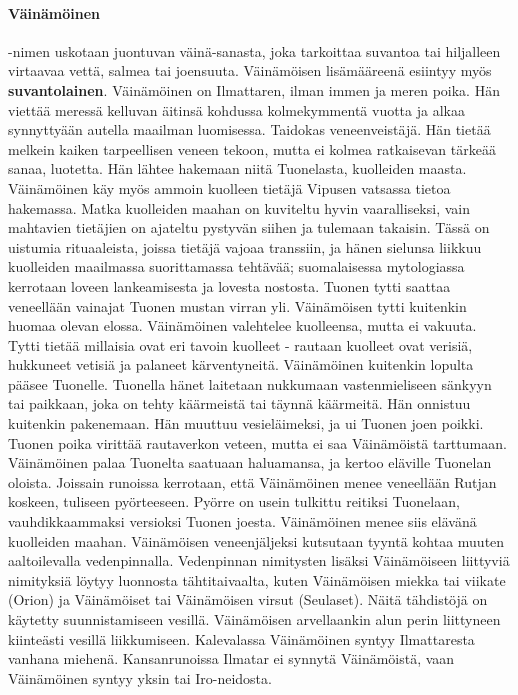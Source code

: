   \paragraph{Väinämöinen}-nimen uskotaan juontuvan väinä-sanasta, joka tarkoittaa suvantoa tai 
    hiljalleen virtaavaa vettä, salmea tai joensuuta. Väinämöisen lisämääreenä esiintyy myös 
    \textbf{suvantolainen}. Väinämöinen on Ilmattaren, ilman immen ja meren poika. Hän viettää 
    meressä kelluvan äitinsä kohdussa kolmekymmentä vuotta ja alkaa synnyttyään autella maailman 
    luomisessa. Taidokas veneenveistäjä. Hän tietää melkein kaiken tarpeellisen veneen tekoon, 
    mutta ei kolmea ratkaisevan tärkeää sanaa, luotetta. Hän lähtee hakemaan niitä Tuonelasta, 
    kuolleiden maasta. Väinämöinen käy myös ammoin kuolleen tietäjä Vipusen vatsassa tietoa 
    hakemassa. Matka kuolleiden maahan on kuviteltu hyvin vaaralliseksi, vain mahtavien 
    tietäjien on ajateltu pystyvän siihen ja tulemaan takaisin. Tässä on uistumia rituaaleista, 
    joissa tietäjä vajoaa transsiin, ja hänen sielunsa liikkuu kuolleiden maailmassa suorittamassa 
    tehtävää; suomalaisessa mytologiassa kerrotaan loveen lankeamisesta ja lovesta nostosta. 
    Tuonen tytti saattaa veneellään vainajat Tuonen mustan virran yli. Väinämöisen tytti kuitenkin 
    huomaa olevan elossa. Väinämöinen valehtelee kuolleensa, mutta ei vakuuta. Tytti tietää 
    millaisia ovat eri tavoin kuolleet - rautaan kuolleet ovat verisiä, hukkuneet vetisiä ja 
    palaneet kärventyneitä. Väinämöinen kuitenkin lopulta pääsee Tuonelle. Tuonella hänet 
    laitetaan nukkumaan vastenmieliseen sänkyyn tai paikkaan, joka on tehty käärmeistä tai 
    täynnä käärmeitä. Hän onnistuu kuitenkin pakenemaan. Hän muuttuu vesieläimeksi, ja ui Tuonen 
    joen poikki. Tuonen poika virittää rautaverkon veteen, mutta ei saa Väinämöistä tarttumaan. 
    Väinämöinen palaa Tuonelta saatuaan haluamansa, ja kertoo eläville Tuonelan oloista. 
    Joissain runoissa kerrotaan, että Väinämöinen menee veneellään Rutjan koskeen, tuliseen 
    pyörteeseen. Pyörre on usein tulkittu reitiksi Tuonelaan, vauhdikkaammaksi versioksi Tuonen 
    joesta. Väinämöinen menee siis elävänä kuolleiden maahan. Väinämöisen veneenjäljeksi 
    kutsutaan tyyntä kohtaa muuten aaltoilevalla vedenpinnalla. Vedenpinnan nimitysten lisäksi 
    Väinämöiseen liittyviä nimityksiä löytyy luonnosta tähtitaivaalta, kuten Väinämöisen miekka 
    tai viikate (Orion) ja Väinämöiset tai Väinämöisen virsut (Seulaset). Näitä tähdistöjä on 
    käytetty suunnistamiseen vesillä. Väinämöisen arvellaankin alun perin liittyneen kiinteästi 
    vesillä liikkumiseen. Kalevalassa Väinämöinen syntyy Ilmattaresta vanhana miehenä. 
    Kansanrunoissa Ilmatar ei synnytä Väinämöistä, vaan Väinämöinen syntyy yksin tai Iro-neidosta.


